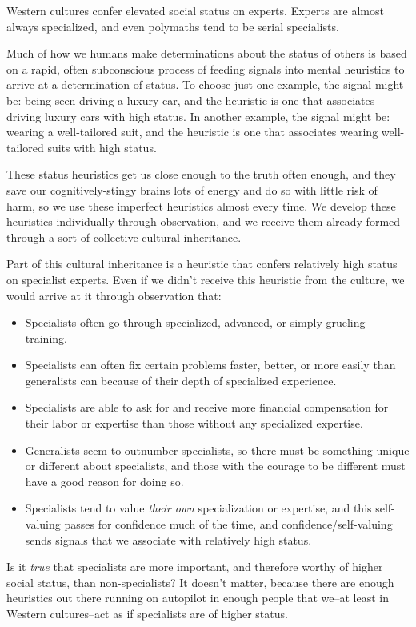 Western cultures confer elevated social status on experts. Experts are almost always specialized, and even polymaths tend to be serial specialists.

Much of how we humans make determinations about the status of others is based on a rapid, often subconscious process of feeding signals into mental heuristics to arrive at a determination of status. To choose just one example, the signal might be: being seen driving a luxury car, and the heuristic is one that associates driving luxury cars with high status. In another example, the signal might be: wearing a well-tailored suit, and the heuristic is one that associates wearing well-tailored suits with high status.

These status heuristics get us close enough to the truth often enough, and they save our cognitively-stingy brains lots of energy and do so with little risk of harm, so we use these imperfect heuristics almost every time. We develop these heuristics individually through observation, and we receive them already-formed through a sort of collective cultural inheritance.

Part of this cultural inheritance is a heuristic that confers relatively high status on specialist experts. Even if we didn't receive this heuristic from the culture, we would arrive at it through observation that:

\begin{itemize}
\item Specialists often go through specialized, advanced, or simply grueling training.
\item Specialists can often fix certain problems faster, better, or more easily than generalists can because of their depth of specialized experience.
\item Specialists are able to ask for and receive more financial compensation for their labor or expertise than those without any specialized expertise.
\item Generalists seem to outnumber specialists, so there must be something unique or different about specialists, and those with the courage to be different must have a good reason for doing so.
\item Specialists tend to value \emph{their own} specialization or expertise, and this self-valuing passes for confidence much of the time, and confidence/self-valuing sends signals that we associate with relatively high status.
\end{itemize}

Is it \emph{true} that specialists are more important, and therefore worthy of higher social status, than non-specialists? It doesn't matter, because there are enough heuristics out there running on autopilot in enough people that we--at least in Western cultures--act as if specialists are of higher status.

